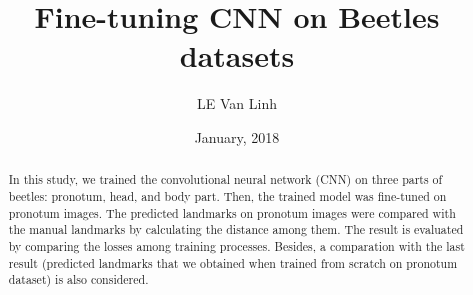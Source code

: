 \documentclass[12pt,a4paper]{article}
\begin{document}
\title{Fine-tuning CNN on Beetles datasets}
\author{LE Van Linh}
\date{January, 2018}
\maketitle
\begin{abstract}
	In this study, we trained the convolutional neural network (CNN) \cite{lecun2010convolutional} on three parts of beetles: pronotum, head, and body part. Then, the trained model was fine-tuned on pronotum images. The predicted landmarks on pronotum images were compared with the manual landmarks by calculating the distance among them. The result is evaluated by comparing the losses among training processes. Besides, a comparation with the last result (predicted landmarks that we obtained when trained from scratch on pronotum dataset) is also considered.
\end{abstract}
\end{document}
